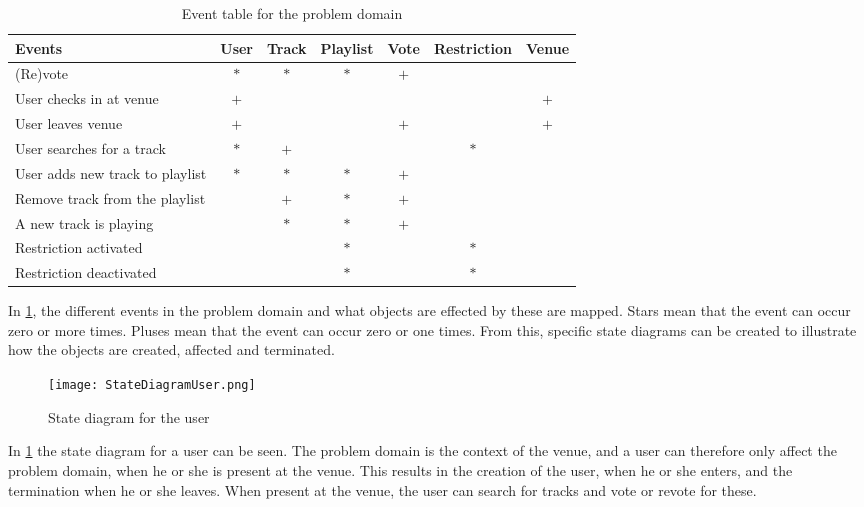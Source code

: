 \begin{table}[htbp]
    \begin{tabular}{lcccccc}
        \toprule
        \textbf{Events}                 & User   & Track  & Playlist & Vote   & Restriction & Venue\\
        \midrule
        (Re)vote                        & $\ast$ & $\ast$ &   $\ast$ &   $+$  &             &      \\
        User checks in at venue         & $+$    &        &          &        &             & $+$ \\
        User leaves venue               & $+$    &        &          &  $+$   &             & $+$ \\
        User searches for a track       & $\ast$ &  $+$   &          &        & $\ast$      &   \\
        User adds new track to playlist & $\ast$ & $\ast$ & $\ast$   & $+$    &             &   \\
        Remove track from the playlist  &        & $+$    & $\ast$   & $+$    &             &   \\
        A new track is playing          &        & $\ast$ & $\ast$   & $+$    &             &  \\
        Restriction activated           &        &        & $\ast$   &        & $\ast$      &  \\
        Restriction deactivated         &        &        & $\ast$   &        & $\ast$      & \\
        \bottomrule
    \end{tabular}
    \caption{Event table for the problem domain}\label{eventtable}
\end{table}

In \cref{eventtable}, the different events in the problem domain and
what objects are effected by these are mapped. Stars mean that the
event can occur zero or more times. Pluses mean that the event can
occur zero or one times. From this, specific state diagrams can be created to illustrate how the objects are created, affected and terminated.

\begin{figure}[H]
  \centering
  \texttt{[image: StateDiagramUser.png]}
  \caption{State diagram for the user}\label{fig:StateDiagramUser}
\end{figure}

In \cref{fig:StateDiagramUser} the state diagram for a user can be seen. The problem domain is the context of the venue, and a user can therefore only affect the problem domain, when he or she is present at the venue. This results in the creation of the user, when he or she enters, and the termination when he or she leaves. When present at the venue, the user can search for tracks and vote or revote for these.

